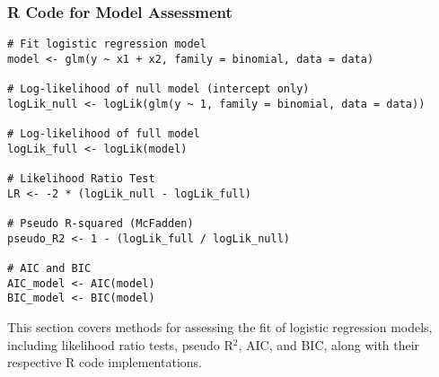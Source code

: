\documentclass[11pt]{article}
\begin{document}
\subsubsection{R Code for Model Assessment}
\begin{verbatim}
# Fit logistic regression model
model <- glm(y ~ x1 + x2, family = binomial, data = data)

# Log-likelihood of null model (intercept only)
logLik_null <- logLik(glm(y ~ 1, family = binomial, data = data))

# Log-likelihood of full model
logLik_full <- logLik(model)

# Likelihood Ratio Test
LR <- -2 * (logLik_null - logLik_full)

# Pseudo R-squared (McFadden)
pseudo_R2 <- 1 - (logLik_full / logLik_null)

# AIC and BIC
AIC_model <- AIC(model)
BIC_model <- BIC(model)
\end{verbatim}

This section covers methods for assessing the fit of logistic regression models, including likelihood ratio tests, pseudo R\(^2\), AIC, and BIC, along with their respective R code implementations.
\end{document}
